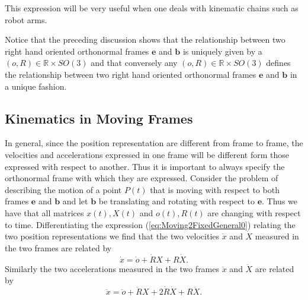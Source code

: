\documentclass[graybox,envcountchap,sectrefs]{svmonoMuga}
\begin{document}
This expression will be very useful when one deals with kinematic chains such as robot arms.
\begin{svgraybox}
Notice that the preceding discussion shows that the relationship between two right hand oriented orthonormal frames $\mathbf{e}$ and $\mathbf{b}$ is uniquely given by a $(o,R)\in\mathbb{R}\times SO(3)$ and that conversely any $(o,R)\in\mathbb{R}\times SO(3)$ defines the relationship between two right hand oriented orthonormal frames $\mathbf{e}$ and $\mathbf{b}$ in a unique fashion.
\end{svgraybox}


\subsection{Kinematics in  Moving Frames}
In general, since the position representation are different from frame to frame, the velocities and accelerations expressed in one frame will be different form those expressed with 
respect to another. Thus it is important to always specify the orthonormal frame with which they are expressed. Consider the problem of describing the motion of a point $P(t)$ that is moving with respect to both frames $\mathbf{e}$ and $\mathbf{b}$ and let $\mathbf{b}$ be translating and rotating with respect to $\mathbf{e}$. Thus we have that all matrices $x(t),X(t)$ and $o(t),R(t)$ are changing with respect to time.  Differentiating the expression (\ref{eq:Moving2FixedGeneral0}) relating the two position representations we find that the two velocities $\dot{x}$ and $\dot{X}$ measured in the two frames are related by
\[
\dot{x}=\dot{o}+\dot{R}X+R\dot{X}.
\]
Similarly the two accelerations measured in the two frames $\ddot{x}$ and $\ddot{X}$ are related by
\[
\ddot{x}=\ddot{o}+\ddot{R}X+2\dot{R}\dot{X}+R\ddot{X}.
\]
\end{document}
